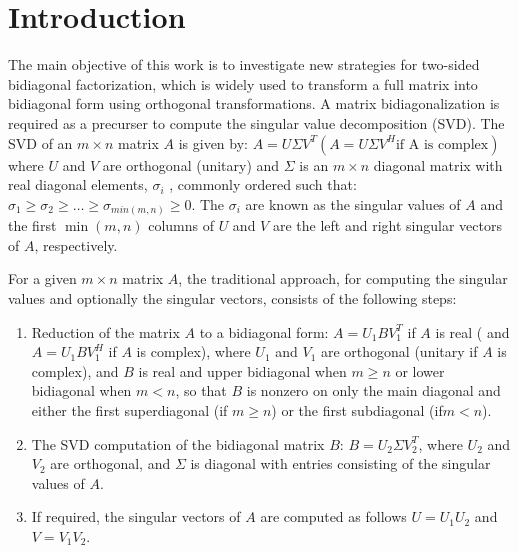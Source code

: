 \section{Introduction}
The main objective of this work is to investigate new strategies for
two-sided bidiagonal factorization, which is widely used to transform
a full matrix into bidiagonal form using orthogonal transformations.
A matrix bidiagonalization is required as a precurser to compute the
singular value decomposition (SVD).  The SVD of an $m\times n$ matrix
$A$ is given by: $A = U \Sigma V^T (A = U \Sigma V^H \text{if A is
  complex})$ where $U$ and $V$ are orthogonal (unitary) and $\Sigma$
is an $m\times n$ diagonal matrix with real diagonal elements,
$\sigma_i$ , commonly ordered such that: $\sigma_1 \ge \sigma_2 \ge
\dots \ge \sigma_{min(m,n)} \ge 0.$ The $\sigma_i$ are known as the
singular values of $A$ and the first $\min(m, n)$ columns of $U$ and
$V$ are the left and right singular vectors of $A$, respectively.

For a given $m\times n$ matrix $A$,
the traditional approach, for computing the singular
values and optionally the singular vectors,
consists of the following steps:
\begin{enumerate}
\item Reduction of the matrix $A$ to a bidiagonal form: 
$A = U_1BV^T_1$ if $A$ is real ( and $A = U_1BV^H_1$ if $A$ is complex), where
  $U_1$ and $V_1$ are orthogonal (unitary if $A$ is complex), and $B$ is
  real and upper bidiagonal when $m \ge n$ or lower bidiagonal when $m < n$,
  so that $B$ is nonzero on only the main diagonal and either the first
  superdiagonal (if $m \ge n$) or the first subdiagonal (if$ m < n$).

\item The SVD computation of the bidiagonal matrix $B$: $B = U_2 \Sigma
  V_2^T$, where $U_2$ and $V_2$ are orthogonal, and $\Sigma$ is
  diagonal with entries consisting of the singular values of $A$.
\item If required, the singular vectors of $A$ are computed as
  follows $U = U_1U_2$ and $V = V_1 V_2$.
\end{enumerate}

